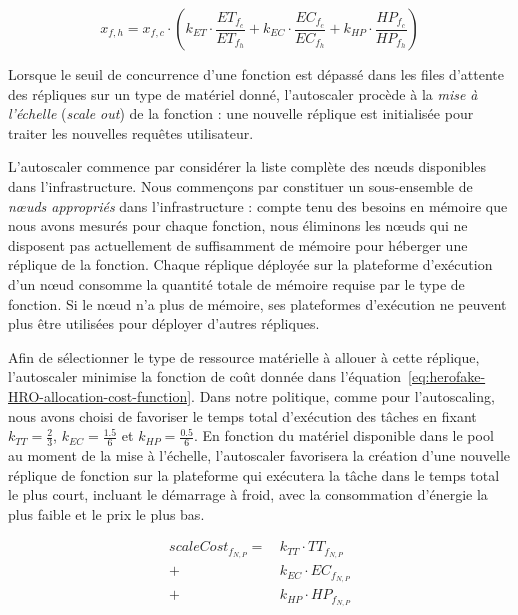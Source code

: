 \begin{equation}
    x_{f, h} = x_{f, c} \cdot (k_{ET} \cdot \frac{ET_{{f}_{c}}}{ET_{{f}_{h}}} + k_{EC} \cdot \frac{EC_{{f}_{c}}}{EC_{{f}_{h}}} + k_{HP} \cdot \frac{HP_{{f}_{c}}}{HP_{{f}_{h}}})
\label{eq:herofake-HRO-concurrency-target}
\end{equation}

Lorsque le seuil de concurrence d'une fonction est dépassé dans les files d'attente des répliques sur un type de matériel donné, l'autoscaler procède à la \textit{mise à l'échelle} (\textit{scale out}) de la fonction : une nouvelle réplique est initialisée pour traiter les nouvelles requêtes utilisateur.

L'autoscaler commence par considérer la liste complète des nœuds disponibles dans l'infrastructure. Nous commençons par constituer un sous-ensemble de \textit{nœuds appropriés} dans l'infrastructure : compte tenu des besoins en mémoire que nous avons mesurés pour chaque fonction, nous éliminons les nœuds qui ne disposent pas actuellement de suffisamment de mémoire pour héberger une réplique de la fonction. Chaque réplique déployée sur la plateforme d'exécution d'un nœud consomme la quantité totale de mémoire requise par le type de fonction. Si le nœud n'a plus de mémoire, ses plateformes d'exécution ne peuvent plus être utilisées pour déployer d'autres répliques.

Afin de sélectionner le type de ressource matérielle à allouer à cette réplique, l'autoscaler minimise la fonction de coût donnée dans l'équation~\ref{eq:herofake-HRO-allocation-cost-function}. Dans notre politique, comme pour l'autoscaling, nous avons choisi de favoriser le temps total d'exécution des tâches en fixant $k_{TT} = \frac{2}{3}$, $k_{EC} = \frac{1.5}{6}$ et $k_{HP} = \frac{0.5}{6}$. 
En fonction du matériel disponible dans le pool au moment de la mise à l'échelle, l'autoscaler favorisera la création d'une nouvelle réplique de fonction sur la plateforme qui exécutera la tâche dans le temps total le plus court, incluant le démarrage à froid, avec la consommation d'énergie la plus faible et le prix le plus bas.

\begin{equation}
\begin{split}
    scaleCost_{{f}_{N, P}} = \, &k_{TT} \cdot {TT}_{{f}_{N, P}} \\
    + &k_{EC} \cdot {EC}_{{f}_{N, P}} \\
    + &k_{HP} \cdot {HP}_{{f}_{N, P}}
\end{split}
\label{eq:herofake-HRO-allocation-cost-function}
\end{equation}

